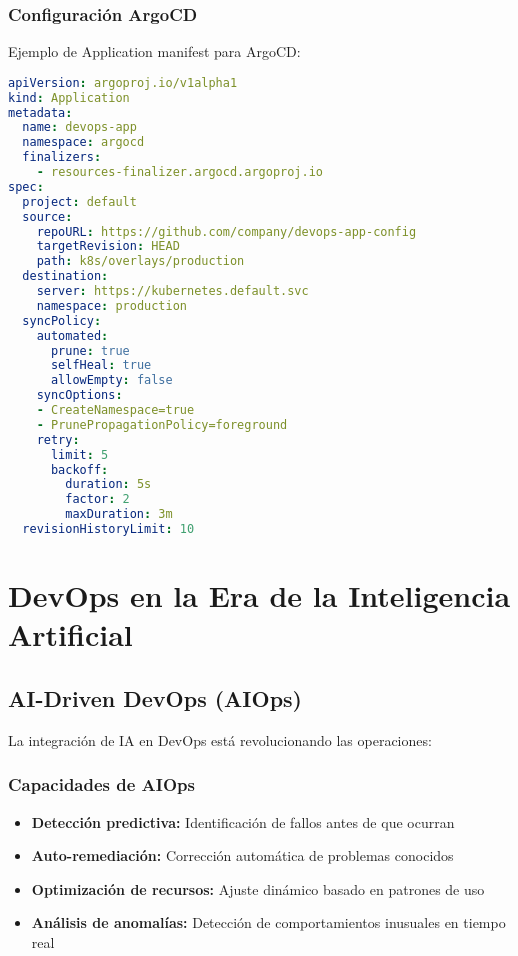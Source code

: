 \documentclass[12pt,a4paper]{article}
\begin{document}
\newpage

\subsubsection{Configuración ArgoCD}
Ejemplo de Application manifest para ArgoCD:
\begin{lstlisting}[language=yaml, caption=ArgoCD Application Configuration]
apiVersion: argoproj.io/v1alpha1
kind: Application
metadata:
  name: devops-app
  namespace: argocd
  finalizers:
    - resources-finalizer.argocd.argoproj.io
spec:
  project: default
  source:
    repoURL: https://github.com/company/devops-app-config
    targetRevision: HEAD
    path: k8s/overlays/production
  destination:
    server: https://kubernetes.default.svc
    namespace: production
  syncPolicy:
    automated:
      prune: true
      selfHeal: true
      allowEmpty: false
    syncOptions:
    - CreateNamespace=true
    - PrunePropagationPolicy=foreground
    retry:
      limit: 5
      backoff:
        duration: 5s
        factor: 2
        maxDuration: 3m
  revisionHistoryLimit: 10
\end{lstlisting}

\section{DevOps en la Era de la Inteligencia Artificial}

\subsection{AI-Driven DevOps (AIOps)}
La integración de IA en DevOps está revolucionando las operaciones:

\subsubsection{Capacidades de AIOps}
\begin{itemize}
    \item \textbf{Detección predictiva:} Identificación de fallos antes de que ocurran
    \item \textbf{Auto-remediación:} Corrección automática de problemas conocidos
    \item \textbf{Optimización de recursos:} Ajuste dinámico basado en patrones de uso
    \item \textbf{Análisis de anomalías:} Detección de comportamientos inusuales en tiempo real
\end{itemize}
\end{document}
